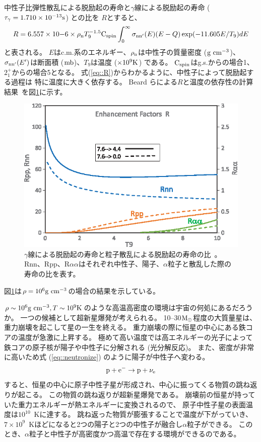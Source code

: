 中性子比弾性散乱による脱励起の寿命と$\gamma$線による脱励起の寿命 ($\tau_{\gamma} = 1.710\times10^{-13} {\rm s}$) との比を
$R$とすると、
\begin{equation}
  R = 6.557\times10{-6}\times\rho_{\rm n}T_{9}^{-1.5}{\rm C}_{{\rm spin}}
  \int^{\infty}_{0}\sigma_{\rm nn'}(E)(E-Q)\exp(-11.605E/T_{9})dE
  \label{eq::R}
\end{equation}
と表される。
$E$はc.m.系のエネルギー、$\rho_{\rm n}$は中性子の質量密度 (${\rm g}~{\rm cm}^{-3}$)、
$\sigma_{\rm nn'}(E')$は断面積 (${\rm mb}$)、$T_{9}$は温度 ($\times10^{9} {\rm K}$) である。
${\rm C}_{{\rm spin}}$はg.s.からの場合1、
$2_{1}^{+}$からの場合5となる。
式(\ref{eq::R})からわかるように、中性子によって脱励起する過程は
特に温度に大きく依存する。
Beard らによる$R$と温度の依存性の計算結果~\cite{hotdensemedium}を図\ref{fig::R}に示す。
\begin{figure}
  \centering
  \includegraphics[clip, width=0.6\columnwidth]{eps/R_T.eps}
  \caption[$\gamma$線による脱励起の寿命と粒子散乱による脱励起の寿命の比。]
          {$\gamma$線による脱励起の寿命と粒子散乱による脱励起の寿命の比~\cite{hotdensemedium}。
    Rnn、Rpp、R$\alpha\alpha$はそれぞれ中性子、陽子、$\alpha$粒子と散乱した際の寿命の比を表す。}
  \label{fig::R}
\end{figure}
図\ref{fig::R}は$\rho = 10^{6}{\rm g}~{\rm cm}^{-3}$の場合の結果を示している。

$\rho\sim10^{6}{\rm g~cm^{-3}}, T\sim10^{9}{\rm K}$のような高温高密度の環境は宇宙の何処にあるだろうか。
一つの候補として超新星爆発が考えられる。
10--30$\rm M_{\odot}$程度の大質量星は、重力崩壊を起こして星の一生を終える。
重力崩壊の際に恒星の中心にある鉄コアの温度が急激に上昇する。
極めて高い温度では高エネルギーの光子によって鉄コアの原子核が陽子や中性子に分解される (光分解反応)。
また、密度が非常に高いため式 (\ref{eq::neutronize}) のように陽子が中性子へ変わる。
\begin{equation}
  {\rm p}+{\rm e}^{-} \rightarrow {\rm p}+\nu_{\rm e}
  \label{eq::neutronize}
\end{equation}
すると、恒星の中心に原子中性子星が形成され、中心に振ってくる物質の跳ね返りが起こる。
この物質の跳ね返りが超新星爆発である。
崩壊前の恒星が持っていた重力エネルギーが熱エネルギーに変換されるので、
原子中性子星の表面温度は$10^10$~Kに達する。
跳ね返った物質が膨張することで温度が下がっていき、
$7\times10^9$~Kほどになると2つの陽子と2つの中性子が融合し$\alpha$粒子ができる。
このとき、$\alpha$粒子と中性子が高密度かつ高温で存在する環境ができるのである。

